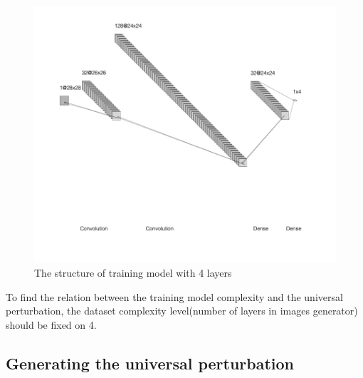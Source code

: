\documentclass{article}
\begin{document}
\begin{table}
\begin{center}
\end{center}
\caption{The structure of training model with 4 layers}
\label{table:training_model_structure}
\end{table}

\begin{figure}[h]
    \centering
    \includegraphics[width=0.9\linewidth]{training_model_structure.png}
    \caption{\small The structure of training model with 4 layers}
    \label{fig:training_model_structure}
\end{figure}

To find the relation between the training model complexity and the universal perturbation, the dataset complexity level(number of layers in images generator) should be fixed on 4.

\subsection{Generating the universal perturbation}
\end{document}
